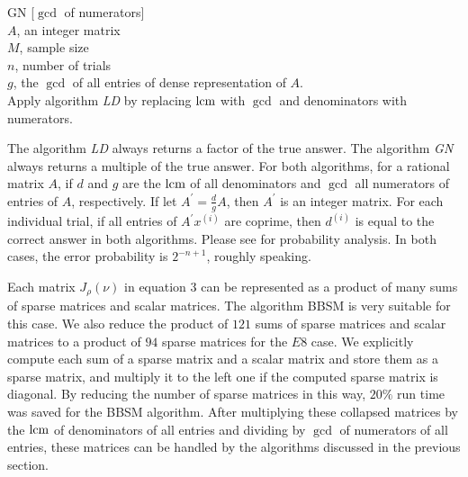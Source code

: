 \begin{algorithm}{GN [$\gcd$ of numerators]}
\Inspec \\
$A$, an integer matrix\\
$M$, sample size\\
$n$, number of trials
\Outspec \\
$g$, the $\gcd$ of all entries of dense representation of $A$.
\Procspec\\
Apply algorithm {\em LD} by replacing $\mbox{lcm}$ with $\gcd$ and 
denominators with numerators.
\end{algorithm}
The algorithm {\em LD}
always returns a factor of the true answer.
The algorithm {\em GN}
always returns a multiple of the true answer.
For both algorithms, for a rational matrix $A$, if 
$d$ and $g$ are the $\mbox{lcm}$ of all denominators 
and $\gcd$ all numerators of entries of $A$, respectively.
If let $A^\prime = \frac{d}{g}A$, then $A^\prime$ is an integer matrix.
For each individual trial,
if all entries of  $A^\prime x^{(i)}$ are coprime,
then $d^{(i)}$ is equal to the correct answer in both algorithms.
Please see \cite{Saunders::LA::2004} for probability analysis. %
In both cases, the error probability is 
$2^{-n + 1}$, roughly speaking.

Each matrix $J_\rho(\nu)$ in equation 3 can be represented as
a product of many sums of sparse matrices and scalar matrices.
The algorithm BBSM is very suitable for this case.
We also reduce the product of $121$ sums of sparse matrices and scalar matrices
to a product of $94$ sparse matrices for the $E8$ case. 
We explicitly compute each sum of a sparse matrix and a scalar matrix and 
store them as a sparse matrix, 
and multiply it to the left one if the computed sparse matrix is 
diagonal. By reducing the number of sparse matrices in this way, 
$20\%$ run time was saved for the BBSM algorithm. 
After multiplying these collapsed matrices 
by the $\mbox{lcm}$ of denominators of all entries and dividing
by $\gcd$ of numerators of all entries, these matrices can be handled by the
algorithms discussed in the previous section.



